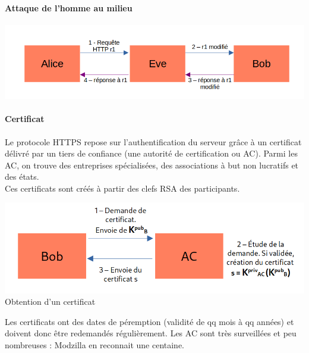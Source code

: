 \paragraph{Attaque de l'homme au milieu}
\begin{center}
	\includegraphics[scale=0.5]{Developpements/protocole https/homme_du_milieu.png}
\end{center}

\paragraph{Certificat\\}
Le protocole HTTPS repose sur l'authentification du serveur grâce à un certificat délivré par un tiers de confiance (une autorité de certification ou AC). Parmi les AC, on trouve des entreprises spécialisées, des associations à but non lucratifs et des états.  \\
Ces certificats sont créés à partir des clefs RSA des participants. 
\\
\begin{center}
	\includegraphics[scale=0.5]{Developpements/protocole https/certificat.png}
	{Obtention d'un certificat}
\end{center}

\begin{com}
	Les certificats ont des dates de péremption (validité de qq mois à qq années) et doivent donc être redemandés régulièrement. Les AC sont très surveillées et peu nombreuses : Modzilla en reconnait une centaine.
\end{com}

